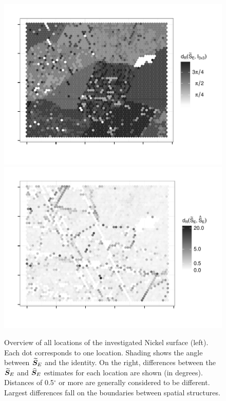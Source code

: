 \begin{figure}[htbp] %
   \centering
   \includegraphics[width=.49\textwidth]{images/grain-map.pdf} 
   \includegraphics[width=.49\textwidth]{images/grain-diff.pdf} 
   \caption{ \label{fig:grain-map} Overview of all locations of the investigated Nickel surface (left). Each dot corresponds to one location.  Shading shows the angle between ${\widetilde{\bm S}_E}$ and the identity. On the right, differences between the ${\widetilde{\bm S}_E}$ and ${\widehat{\bm S}_E}$ estimates for each location are shown (in degrees). Distances of 0.5$^\circ$ or more are generally considered to be different. Largest differences fall on the boundaries between spatial structures.}
\end{figure}
\vspace{-0.25cm}
